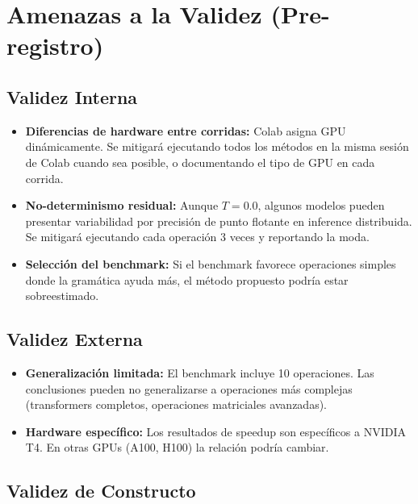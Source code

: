 \documentclass[12pt]{article}
\begin{document}
\section{Amenazas a la Validez (Pre-registro)}

\subsection{Validez Interna}

\begin{itemize}
  \item \textbf{Diferencias de hardware entre corridas:} Colab asigna GPU dinámicamente.
    Se mitigará ejecutando todos los métodos en la misma sesión de Colab cuando sea
    posible, o documentando el tipo de GPU en cada corrida.

  \item \textbf{No-determinismo residual:} Aunque $T=0.0$, algunos modelos pueden
    presentar variabilidad por precisión de punto flotante en inference distribuida.
    Se mitigará ejecutando cada operación 3 veces y reportando la moda.

  \item \textbf{Selección del benchmark:} Si el benchmark favorece operaciones simples
    donde la gramática ayuda más, el método propuesto podría estar sobreestimado.
\end{itemize}

\subsection{Validez Externa}

\begin{itemize}
  \item \textbf{Generalización limitada:} El benchmark incluye 10 operaciones.
    Las conclusiones pueden no generalizarse a operaciones más complejas
    (transformers completos, operaciones matriciales avanzadas).

  \item \textbf{Hardware específico:} Los resultados de speedup son específicos a
    NVIDIA T4. En otras GPUs (A100, H100) la relación podría cambiar.
\end{itemize}

\subsection{Validez de Constructo}
\end{document}
